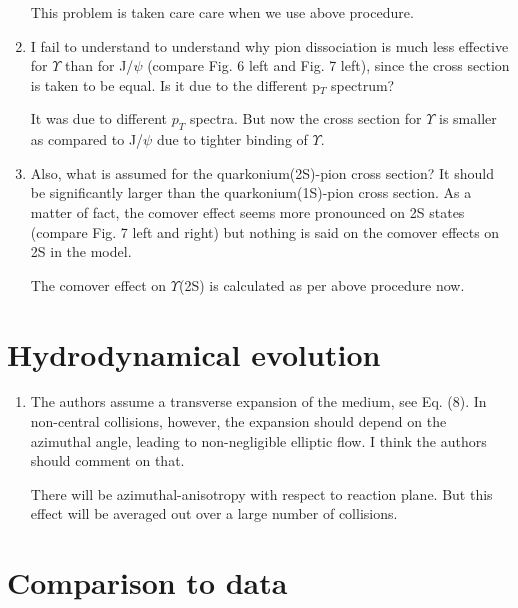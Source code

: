 \documentclass[aps,prc,preprint,superscriptaddress,showpacs,showkeys]{revtex4-1}
\begin{document}
\begin{enumerate}
{\color{blue} 
 This problem is taken care care when we use above procedure.
}

\item { \color{red} I fail to understand to understand why pion dissociation is much
less effective for $\Upsilon$ than for J/$\psi$ (compare Fig. 6 left and
Fig. 7 left), since the cross section is taken to be equal. Is it due
to the different p$_T$ spectrum?}

{ \color{blue} It was due to different $p_T$ spectra. But now the cross section for 
$\Upsilon$ is smaller as compared to J/$\psi$ due to tighter binding of $\Upsilon$. }

\item { \color{red} Also, what is assumed for the quarkonium(2S)-pion cross section? It
should be significantly larger than the quarkonium(1S)-pion cross
section. As a matter of fact, the comover effect seems more pronounced
on 2S states (compare Fig. 7 left and right) but nothing is said on
the comover effects on 2S in the model.}

{ \color{blue} The comover effect on $\Upsilon$(2S) is calculated as per above procedure now.


}

\end{enumerate}


\section{Hydrodynamical evolution}

\begin{enumerate}
\item { \color{red} The authors assume a transverse expansion of the medium, see Eq.
(8). In non-central collisions, however, the expansion should depend
on the azimuthal angle, leading to non-negligible elliptic flow. I
think the authors should comment on that.}

{ \color{blue} There will be azimuthal-anisotropy with respect to reaction plane. But this
effect will be averaged out over a large number of collisions.}

\end{enumerate}

\section{Comparison to data}
\end{document}

